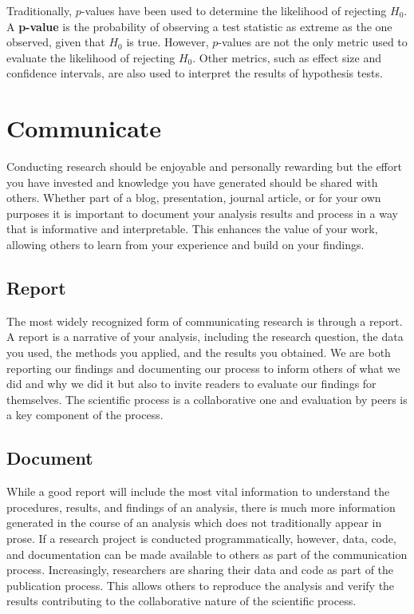 \documentclass[
  letterpaper,
  krantz1]{latex/krantz-mod}
\theoremstyle{definition}
\theoremstyle{definition}
\theoremstyle{remark}
\begin{document}
Traditionally, \(p\)-values have been used to determine the likelihood
of rejecting \(H_0\). A \textbf{p-value} is the
probability of observing a test statistic as extreme as the one
observed, given that \(H_0\) is true. However, \(p\)-values are not the
only metric used to evaluate the likelihood of rejecting \(H_0\). Other
metrics, such as effect size and confidence
intervals, are also used to interpret the
results of hypothesis tests.

\section{Communicate}\label{sec-analysis-communicate}

Conducting research should be enjoyable and personally rewarding but the
effort you have invested and knowledge you have generated should be
shared with others. Whether part of a blog, presentation, journal
article, or for your own purposes it is important to document your
analysis results and process in a way that is informative and
interpretable. This enhances the value of your work, allowing others to
learn from your experience and build on your findings.

\subsection{Report}\label{sec-analysis-report}

The most widely recognized form of communicating research is through a
report. A report is a narrative of your analysis, including the research
question, the data you used, the methods you applied, and the results
you obtained. We are both reporting our findings and documenting our
process to inform others of what we did and why we did it but also to
invite readers to evaluate our findings for themselves. The scientific
process is a collaborative one and evaluation by peers is a key
component of the process.

\subsection{Document}\label{sec-analysis-document}

While a good report will include the most vital information to
understand the procedures, results, and findings of an analysis, there
is much more information generated in the course of an analysis which
does not traditionally appear in prose. If a research project is
conducted programmatically, however, data, code, and documentation can
be made available to others as part of the communication
process.
Increasingly, researchers are sharing their data and code as part of the
publication process. This allows others to reproduce the analysis and
verify the results contributing to the collaborative nature of the
scientific process.
\end{document}
